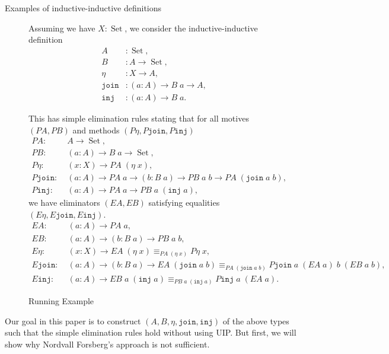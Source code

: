 \documentclass[acmsmall,review]{acmart}\settopmatter{printfolios=true,printccs=false,printacmref=false}
\DeclareMathOperator{\USet}{Set}
\newcommand{\IdA}[3]{{#1}\equiv_{#3}{#2}}
\newcommand{\join}{\texttt{join}}
\newcommand{\inj}{\texttt{inj}}
\def\Forsberg/{Nordvall Forsberg}
\begin{document}
\begin{section}{\label{II-examples}Examples of inductive-inductive definitions}
\begin{figure}[htpb]
    \begin{flushleft}
        Assuming we have $X : \USet$, we consider the inductive-inductive definition
        \begin{align*}
        A &: \USet,\\
        B &: A \to \USet,\\
        \eta &: X \to A,\\
        \join &: (a : A) \to B\;a \to A,\\
        \inj &: (a : A) \to B\;a.
        \end{align*}
        
        This has simple elimination rules stating that for all motives $(PA, PB)$ and methods $(P\eta, P\join, P\inj)$
        \begin{align*}
        PA :&\; A \to \USet,\\
        PB :&\; (a : A) \to B\;a\to \USet,\\
        P\eta :&\; (x : X) \to PA\;(\eta\;x),\\
        P\join :&\; (a : A) \to PA\;a\to (b : B\;a) \to PB\;a\;b \to PA\;(\join\;a\;b),\\
        P\inj :&\; (a : A) \to PA\;a\to PB\;a\;(\inj\;a),
        \end{align*}
        we have eliminators $(EA, EB)$ satisfying equalities $(E\eta, E\join, E\inj)$.
        \begin{align*}
        EA :&\; (a : A) \to PA\;a,\\
        EB :&\; (a : A) \to (b : B\;a) \to PB\;a\;b,\\
        E\eta :&\; (x : X) \to \IdA{EA\;(\eta\;x)}{P\eta\;x}{PA\;(\eta\;x)},\\
        E\join :&\; (a : A) \to (b : B\;a) \to \IdA{EA\;(\join\;a\;b)}{P\join\;a\;(EA\;a)\;b\;(EB\;a\;b)}{PA\;(\join\;a\;b)},\\
        E\inj :&\; (a : A) \to \IdA{EB\;a\;(\inj\;a)}{P\inj\;a\;(EA\;a)}{PB\;a\;(\inj\;a)}.
        \end{align*}
    \end{flushleft}
    
    \caption{\label{example-definition}Running Example}
\end{figure}

Our goal in this paper is to construct $(A,B,\eta,\join,\inj)$ of the above types such that the simple elimination rules hold without using UIP. But first, we will show why \Forsberg/'s approach is not sufficient.

\end{section}
\end{document}
